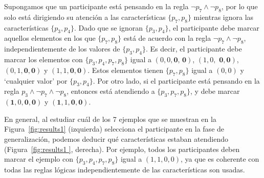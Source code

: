 Supongamos que un participante está pensando en la regla $ \lnot p_7 \land \lnot p_8 $, por lo que solo está dirigiendo su atención a las características $ \{p_7, p_8 \} $ mientras ignora las características $ \{p_3, p_4 \} $. Dado que se ignoran $ \{p_3, p_4 \} $, el participante debe marcar aquellos elementos en los que $ \{p_7, p_8 \} $ está de acuerdo con la regla $ \lnot p_7 \land \lnot p_8 $, independientemente de los valores de $ \{p_3, p_4 \} $. Es decir, el participante debe marcar los elementos con $ \{p_3, p_4, p_7, p_8 \} $ igual a $ (0,0, \textbf {0, 0}) $, $ (1,0, \textbf { 0}, \textbf {0}) $, $ (0,1, \textbf {0}, \textbf {0}) $ y $ (1,1, \textbf {0}, \textbf {0}) $. Estos elementos tienen $ \{p_7, p_8 \} $ igual a $ (0,0) $ y `cualquier valor' por $ \{p_3, p_4 \} $. Por otro lado, si el participante está pensando en la regla $ p_3 \land \lnot p_7 \land \lnot p_8 $, entonces está atendiendo a $ \{p_3, p_7, p_8 \} $, y debe marcar $ ( \textbf {1}, 0, \textbf {0}, \textbf {0}) $ y $ (\textbf {1}, 1, \textbf {0}, \textbf {0}) $.

En general, al estudiar cuál de los 7 ejemplos que se muestran en la Figura~\ref{fig:results1} (izquierda) selecciona el participante en la fase de generalización, podemos deducir qué características estaban atendiendo (Figura~\ref{fig:results1 }, derecha). Por ejemplo, todos los participantes deben marcar el ejemplo con $ \{p_3, p_4, p_7, p_8 \} $ igual a $ (1,1,0,0) $, ya que es coherente con todas las reglas lógicas independientemente de las características son usadas.

